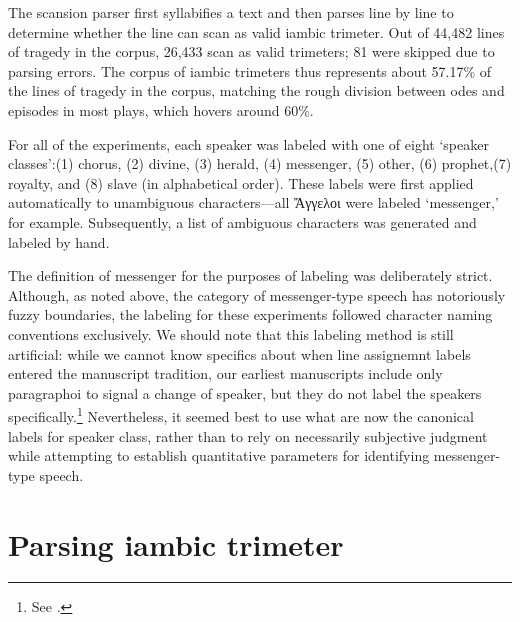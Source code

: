 \documentclass[
]{ceurart}
\begin{document}
The scansion parser first syllabifies a text and then parses line by line to
determine whether the line can scan as valid iambic trimeter. Out of 44,482
lines of tragedy in the corpus, 26,433 scan as valid trimeters; 81 were
skipped due to parsing errors. The corpus of iambic trimeters thus represents
about 57.17\% of the lines of tragedy in the corpus, matching the rough
division between odes and episodes in most plays, which hovers around 60\%.

For all of the experiments, each speaker was labeled with one of eight
`speaker classes':(1) chorus, (2) divine, (3) herald, (4) messenger,
(5) other, (6) prophet,(7) royalty, and (8) slave (in alphabetical order).
These labels were first applied automatically to unambiguous characters---all
Ἄγγελοι were labeled `messenger,' for example. Subsequently, a list of
ambiguous characters was generated and labeled by hand.

The definition of messenger for the purposes of labeling was deliberately
strict. Although, as noted above, the category of messenger-type speech has
notoriously fuzzy boundaries, the labeling for these experiments followed
character naming conventions exclusively. We should note that this labeling
method is still artificial: while we cannot know specifics about when line
assignemnt labels entered the manuscript tradition, our earliest manuscripts
include only paragraphoi to signal a change of speaker, but they do not label
the speakers specifically.\footnote{See \cite
{Mastronarde2016}.} Nevertheless, it seemed best to use what are now the
canonical labels for speaker class, rather than to rely on necessarily
subjective judgment while attempting to establish quantitative parameters for
identifying messenger-type speech.

\section{Parsing iambic trimeter}
\end{document}
